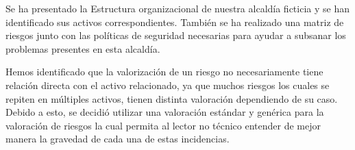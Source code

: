 Se ha presentado la Estructura organizacional de nuestra alcaldía ficticia y se han identificado sus activos correspondientes.
También se ha realizado una matriz de riesgos junto con las políticas de seguridad necesarias para ayudar a subsanar los problemas presentes en esta alcaldía.

Hemos identificado que la valorización de un riesgo no necesariamente tiene relación directa con el activo relacionado, ya que muchos riesgos los cuales se repiten en múltiples activos, tienen distinta valoración dependiendo de su caso. Debido a esto, se decidió utilizar una valoración estándar y genérica para la valoración de riesgos la cual permita al lector no técnico entender de mejor manera la gravedad de cada una de estas incidencias.

